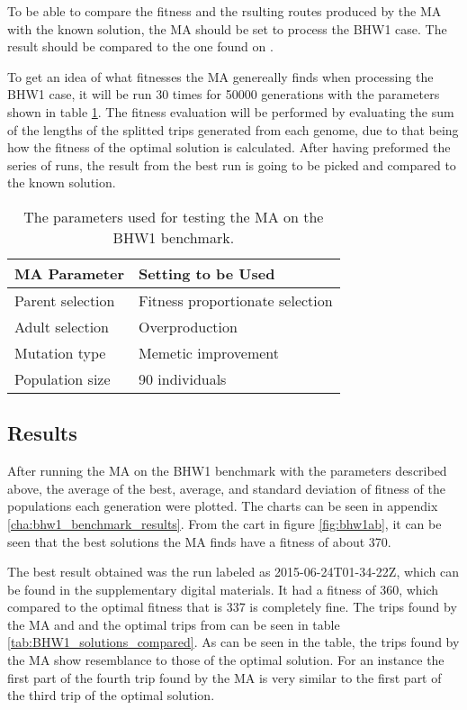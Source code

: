 To be able to compare the fitness and the rsulting routes produced by the MA with the known solution, the MA should be set to process the BHW1 case. The result should be compared to the one found on \citet{BHW1Solution}.

To get an idea of what fitnesses the MA genereally finds when processing the BHW1 case, it will be run 30 times for 50000 generations with the parameters shown in table \ref{tab:BHW1_params_table}. The fitness evaluation will be performed by evaluating the sum of the lengths of the splitted trips generated from each genome, due to that being how the fitness of the optimal solution is calculated. After having preformed the series of runs, the result from the best run is going to be picked and compared to the known solution.

{
\begin{table}[tbph]
\centering
\begin{tabular}{ll}
\hline
\textbf{MA Parameter} & \textbf{Setting to be Used}     \\ \hline
Parent selection      & Fitness proportionate selection \\
Adult selection       & Overproduction                  \\
Mutation type         & Memetic improvement             \\
Population size       & 90 individuals                  \\ \hline
\end{tabular}
\caption{The parameters used for testing the MA on the BHW1 benchmark.}
\label{tab:BHW1_params_table}
\end{table}
}

\subsection{Results}

After running the MA on the BHW1 benchmark with the parameters described above, the average of the best, average, and standard deviation of fitness of the populations each generation were plotted. The charts can be seen in appendix \ref{cha:bhw1_benchmark_results}. From the cart in figure \ref{fig:bhw1ab}, it can be seen that the best solutions the MA finds have a fitness of about 370.

The best result obtained was the run labeled as 2015-06-24T01-34-22Z, which can be found in the supplementary digital materials. It had a fitness of 360, which compared to the optimal fitness that is 337 is completely fine. The trips found by the MA and and the optimal trips from \citet{BHW1Solution} can be seen in table \ref{tab:BHW1_solutions_compared}. As can be seen in the table, the trips found by the MA show resemblance to those of the optimal solution. For an instance the first part of the fourth trip found by the MA is very similar to the first part of the third trip of the optimal solution.

